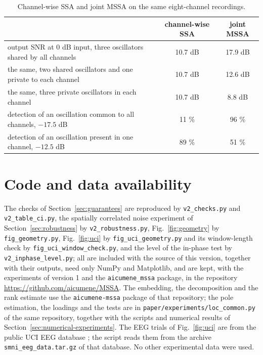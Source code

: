 \documentclass{article}
\begin{document}
\begin{table}[htb]
\centering
\caption{Channel-wise SSA and joint MSSA on the same eight-channel recordings.}
\label{tab:joint}
\begin{tabular}{p{} c c}
\toprule
 & channel-wise SSA & joint MSSA \\
\midrule
output SNR at 0 dB input, three oscillators shared by all channels & 10.7 dB & 17.9 dB \\
the same, two shared oscillators and one private to each channel & 10.7 dB & 12.6 dB \\
the same, three private oscillators in each channel & 10.7 dB & 8.8 dB \\
detection of an oscillation common to all channels, $-17.5$ dB & 11 \% & 96 \% \\
detection of an oscillation present in one channel, $-12.5$ dB & 89 \% & 51 \% \\
\bottomrule
\end{tabular}
\end{table}


\section*{Code and data availability}\label{code-and-data-availability}
The checks of Section~\ref{sec:guarantees} are reproduced by \texttt{v2\_checks.py} and \texttt{v2\_table\_ci.py}, the spatially correlated noise experiment of Section~\ref{sec:robustness} by \texttt{v2\_robustness.py}, Fig.~\ref{fig:geometry} by \texttt{fig\_geometry.py}, Fig.~\ref{fig:uci} by \texttt{fig\_uci\_geometry.py} and its window-length check by \texttt{fig\_uci\_window\_check.py}, and the level of the in-phase test by \texttt{v2\_inphase\_level.py}; all are included with the source of this version, together with their outputs, need only NumPy and Matplotlib, and are kept, with the experiments of version 1 \cite{ref-MSSAv1} and the \texttt{aicumene\_mssa} package, in the repository \url{https://github.com/aicumene/MSSA}. The embedding, the decomposition and the rank estimate use the \texttt{aicumene-mssa} package of that repository; the pole estimation, the loadings and the tests are in \texttt{paper/experiments/loc\_common.py} of the same repository, together with the scripts and numerical results of Section~\ref{sec:numerical-experiments}. The EEG trials of Fig.~\ref{fig:uci} are from the public UCI EEG database \cite{ref-UCI}; the script reads them from the archive \texttt{smni\_eeg\_data.tar.gz} of that database. No other experimental data were used.
\end{document}
